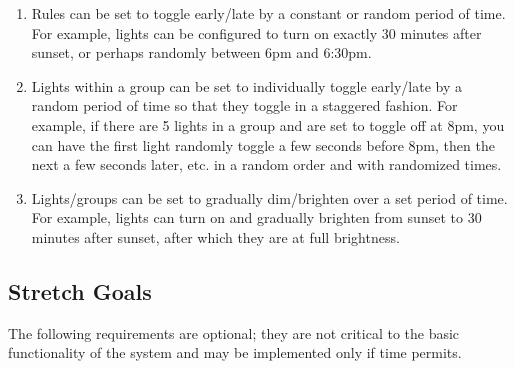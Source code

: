 \documentclass[12pt]{article}
\begin{document}
\begin{enumerate}
\begin{enumerate}
            \item Rules can be set to toggle early/late by a constant or random period of time.  For example, lights can be configured to turn on exactly 30 minutes after sunset, or perhaps randomly between 6pm and 6:30pm.
            \item Lights within a group can be set to individually toggle early/late by a random period of time so that they toggle in a staggered fashion.  For example, if there are 5 lights in a group and are set to toggle off at 8pm, you can have the first light randomly toggle a few seconds before 8pm, then the next a few seconds later, etc. in a random order and with randomized times.
            \item Lights/groups can be set to gradually dim/brighten over a set period of time.  For example, lights can turn on and gradually brighten from sunset to 30 minutes after sunset, after which they are at full brightness.
        \end{enumerate}
\end{enumerate}

\subsection{Stretch Goals}

The following requirements are optional; they are not critical to the basic
functionality of the system and may be implemented only if time permits.
\end{document}
